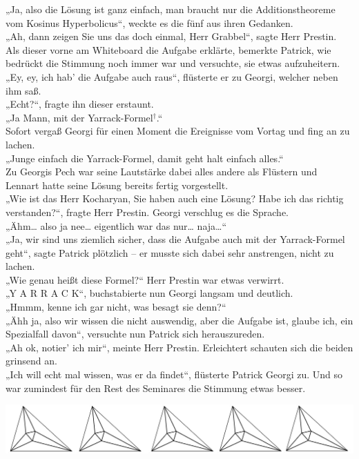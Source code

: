 \documentclass[oneside]{memoir}
\newcommand{\parasep}{
\bigskip
\bigskip
\begin{center} 
   \includegraphics[scale=.08]{parasep5.jpg} 
\end{center}
\bigskip
\bigskip
}
\begin{document}
„Ja, also die Lösung ist ganz einfach, man braucht nur die Additionstheoreme vom Kosinus Hyperbolicus“, weckte es die fünf aus ihren Gedanken. \\
„Ah, dann zeigen Sie uns das doch einmal, Herr Grabbel“, sagte Herr Prestin. \\
Als dieser vorne am Whiteboard die Aufgabe erklärte, bemerkte Patrick, wie bedrückt die Stimmung noch immer war und versuchte, sie etwas aufzuheitern. \\
„Ey, ey, ich hab' die Aufgabe auch raus“, flüsterte er zu Georgi, welcher neben ihm saß. \\
„Echt?“, fragte ihn dieser erstaunt. \\
„Ja Mann, mit der Yarrack-Formel$^{\dagger}$.“ \\
Sofort vergaß Georgi für einen Moment die Ereignisse vom Vortag und fing an zu lachen.  \\
„Junge einfach die Yarrack-Formel, damit geht halt einfach alles.“ \\
Zu Georgis Pech war seine Lautstärke dabei alles andere als Flüstern und Lennart hatte seine Lösung bereits fertig vorgestellt.  \\
„Wie ist das Herr Kocharyan, Sie haben auch eine Lösung? Habe ich das richtig verstanden?“, fragte Herr Prestin. Georgi verschlug es die Sprache. \\
„Ähm\ldots{} also ja nee\ldots{} eigentlich war das nur\ldots{} naja\ldots“ \\
„Ja, wir sind uns ziemlich sicher, dass die Aufgabe auch mit der Yarrack-Formel geht“, sagte Patrick plötzlich -- er musste sich dabei sehr anstrengen, nicht zu lachen. \\
„Wie genau heißt diese Formel?“ Herr Prestin war etwas verwirrt. \\
„Y A R R A C K“, buchstabierte nun Georgi langsam und deutlich.  \\
„Hmmm, kenne ich gar nicht, was besagt sie denn?“ \\
„Ähh ja, also wir wissen die nicht auswendig, aber die Aufgabe ist, glaube ich, ein Spezialfall davon“, versuchte nun Patrick sich herauszureden.  \\
„Ah ok, notier' ich mir“, meinte Herr Prestin. Erleichtert schauten sich die beiden grinsend an.  \\
„Ich will echt mal wissen, was er da findet“, flüsterte Patrick Georgi zu. Und so war zumindest für den Rest des Seminares die Stimmung etwas besser. 

\parasep
\end{document}
